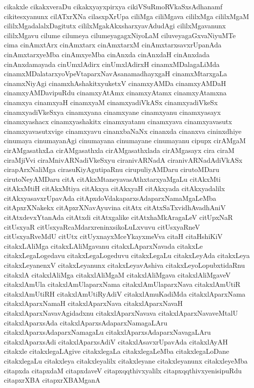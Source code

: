 {cikakxle
cikakxveraDu
cikakxyayxpirxya
cikiVSuRmoRVkaSxsAdhanamf
cikitesxyanunx
cilATxrXNa
cilasxpXrUpa
ciliMga
ciliMgava
cililxMga
cililxMgaM
cililxMgadalalxDagitutx
cililxMgakAkxsharxyavAdudAgi
cililxMgavanunx
cililxMgavu
cilume
cilumeya
cilumeyagagxNiyoLaM
ciluveyagaGxvaNiyuMTe
cima
cinAmxtArx
cinAmxtarx
cinAmxtarxM
cinAmxtarxsavxrUpanAda
cinAmxtarxyeMba
cinAmxyeMba
cinAnxda
cinAnxdaH
cinAnxdada
cinAnxdamayada
cinUmxlAdirx
cinUmxlAdirxH
cinamxMDalagaLiMda
cinamxMDalatarxyoVpeVtaparxNavAsanamadhayxgaH
cinamxMtarxgaLa
cinamxNiyAgi
cinamxhAshakitxyuketxV
cinamxyAMDa
cinamxyAMDaH
cinamxyAMDavipuRdu
cinamxyAtAmx
cinamxyAtamx
cinamxyAtamxna
cinamxya
cinamxyaH
cinamxyaM
cinamxyadiVkASx
cinamxyadiVkeSx
cinamxyadiVkeSxya
cinamxyana
cinamxyane
cinamxyanu
cinamxyasayx
cinamxyashacx
cinamxyashakitx
cinamxyatanu
cinamxyava
cinamxyavasutx
cinamxyavasutxvige
cinamxyavu
cinanxbaNaNx
cinanxda
cinanxva
cininxdhiye
cinumaya
cinumayanAgi
cinumayana
cinumayane
cinumayanu
cipupx
cirAMgaM
cirAMgasathxLa
cirAMgasathxla
cirAMgasathxlada
cirAMgasayx
cira
ciraM
ciraMjiVvi
ciraMnivARNadiVkeSxyu
ciranivARNadA
ciranivARNadAdiVkASx
cirapArxNaliMga
cirasuKiyAgutipaRnu
cirupuliyAMDaru
cirutoMDaru
cirutoNeyAMDaru
citA
citAkxMtaneyavasAthxtarxyaMgaLu
citAkxMti
citAkxMtiH
citAkxMtiya
citAkxya
citAkxyaH
citAkxyada
citAkxyadalilx
citAkxyasavxrUpavAda
citApxdoVdakaparxsAdaparxNamaMgaLeMba
citApxrXNakekx
citApxrXNavAyuvina
citAtx
citAtxSaTxvidhAvadhAniV
citAtxdevxYtanAda
citAtxdi
citAtxgalike
citAtxhaMkAragaLeV
citUpxNaR
citUsxyaR
citUsxyaRcaMdarxreninxsikoLuLxvuvu
citUsxyaRneV
citUsxyaRveMdU
citUtx
citUyxnayxMceYkayxmeVva
citaH
citaHshiKiV
citakxLAliMga
citakxLAliMgavanu
citakxLAparxNavada
citakxLe
citakxLegaLogedavu
citakxLegaLogeduvu
citakxLegaLu
citakxLeyAda
citakxLeya
citakxLeyanenxV
citakxLeyanunx
citakxLeyavAshiva
citakxLeyoLopubxtidaRnu
citakxlA
citakxlAliMga
citakxlAliMgaM
citakxlAliMgava
citakxlAliMgaveV
citakxlAmUla
citakxlAmUlaparxNama
citakxlAmUlaparxNava
citakxlAmUtiR
citakxlAmUtiRH
citakxlAmUtiRyAdiV
citakxlAmuKadiMda
citakxlAparxNama
citakxlAparxNamaH
citakxlAparxNava
citakxlAparxNavaH
citakxlAparxNavavAgidadxnu
citakxlAparxNavava
citakxlAparxNavaveMtalU
citakxlAparxsAda
citakxlAparxsAdaparxNamagaLAru
citakxlAparxsAdaparxNamagaLu
citakxlAparxsAdaparxNavagaLAru
citakxlAparxsAdi
citakxlAparxsAdiV
citakxlAsavxrUpavAda
citakxlAyAH
citakxle
citakxlegaLAgive
citakxlegaLa
citakxlegaLeMba
citakxlegaLoDane
citakxlegaLu
citakxleya
citakxleyalilx
citakxleyane
citakxleyanunx
citakxleyeMba
citapxda
citapxdaM
citapxdaveV
citapxqqthivxyalilx
citapxqqthivxyenisipuRdu
citapxrXBA
citapxrXBAMganA
}
